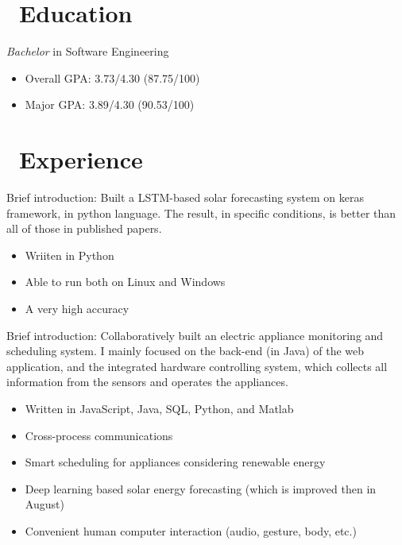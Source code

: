 \documentclass{resume}
\begin{document}



\section{\faGraduationCap\ Education}
\textit{Bachelor} in Software Engineering
\begin{itemize}
  \item Overall GPA: 3.73/4.30 (87.75/100)
  \item Major GPA: 3.89/4.30 (90.53/100)
\end{itemize}

\section{\faUsers\ Experience}
Brief introduction: Built a LSTM-based solar forecasting system on keras framework, in python language. The result, in specific conditions, is better than all of those in published papers.
\begin{itemize}
  \item Wriiten in Python
  \item Able to run both on Linux and Windows
  \item A very high accuracy
\end{itemize}


Brief introduction: Collaboratively built an electric appliance monitoring and scheduling system. I mainly focused on the back-end (in Java) of the web application, and the integrated hardware controlling system, which collects all information from the sensors and operates the appliances.
\begin{itemize}
  \item Written in JavaScript, Java, SQL, Python, and Matlab
  \item Cross-process communications 
  \item Smart scheduling for appliances considering renewable energy
  \item Deep learning based solar energy forecasting (which is improved then in August)
  \item Convenient human computer interaction (audio, gesture, body, etc.)
\end{itemize}
\end{document}
